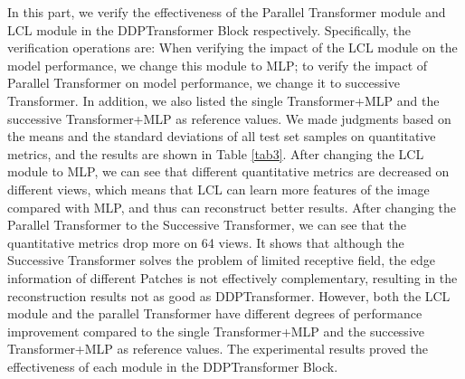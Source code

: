 \documentclass[lettersize,journal]{IEEEtran}
\begin{document}
In this part, we verify the effectiveness of the Parallel Transformer module and LCL module in the DDPTransformer Block respectively. Specifically, the verification operations are: When verifying the impact of the LCL module on the model performance, we change this module to MLP; to verify the impact of Parallel Transformer on model performance, we change it to successive Transformer. In addition, we also listed the single Transformer+MLP and the successive Transformer+MLP as reference values. We made judgments based on the means and the standard deviations of all test set samples on quantitative metrics, and the results are shown in Table \ref{tab3}. After changing the LCL module to MLP, we can see that different quantitative metrics are decreased on different views, which means that LCL can learn more features of the image compared with MLP, and thus can reconstruct better results. After changing the Parallel Transformer to the Successive Transformer, we can see that the quantitative metrics drop more on 64 views. It shows that although the Successive Transformer solves the problem of limited receptive field, the edge information of different Patches is not effectively complementary, resulting in the reconstruction results not as good as DDPTransformer. However, both the LCL module and the parallel Transformer have different degrees of performance improvement compared to the single Transformer+MLP and the successive Transformer+MLP as reference values. The experimental results proved the effectiveness of each module in the DDPTransformer Block.
\end{document}
